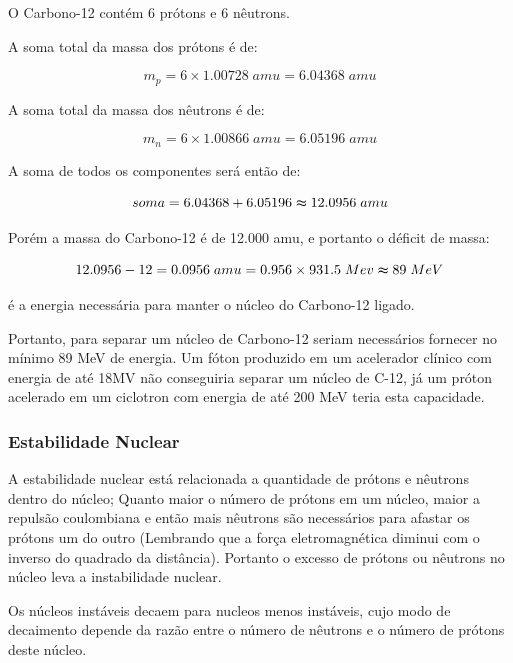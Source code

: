 \documentclass[11pt,a4paper]{article}
\newcounter{exemplo}
\begin{document}
                
                \begin{exemplo}
                    
                    O Carbono-12 contém 6 prótons e 6 nêutrons. 
                    
                    A soma total da massa dos prótons é de:

                    $$m_p = 6 \times 1.00728 \; amu = 6.04368 \; amu$$

                    A soma total da massa dos nêutrons é de:

                    $$m_n = 6 \times 1.00866 \; amu = 6.05196 \; amu$$

                    A soma de todos os componentes será então de: 

                    $$soma = 6.04368 + 6.05196 \thickapprox  12.0956 \; amu$$

                    Porém a massa do Carbono-12 é de 12.000 amu, e portanto o déficit de massa:

                    $$12.0956 - 12 = 0.0956 \; amu = 0.956 \times 931.5 \; Mev \thickapprox 89 \;  MeV$$ 

                    é a energia necessária para manter o núcleo do Carbono-12 ligado.
                \end{exemplo}

                Portanto, para separar um núcleo de Carbono-12 seriam necessários fornecer no mínimo 89 MeV de energia. Um fóton produzido em um acelerador clínico com energia de até 18MV não conseguiria separar um núcleo de C-12, já um próton acelerado em um ciclotron com energia de até 200 MeV teria esta capacidade. 
        
            \subsubsection{Estabilidade Nuclear}
                
                A estabilidade nuclear está relacionada a quantidade de prótons e nêutrons dentro do núcleo; Quanto maior o número de prótons em um núcleo, maior a repulsão coulombiana e então mais nêutrons são necessários para afastar os prótons um do outro 
                (Lembrando que a força eletromagnética diminui com o inverso do quadrado da distância). Portanto o excesso de prótons ou nêutrons no núcleo leva a instabilidade nuclear.
                
                Os núcleos instáveis decaem para nucleos menos instáveis, cujo modo de decaimento depende da razão entre o número de nêutrons e o número de prótons deste núcleo. 
\end{document}
